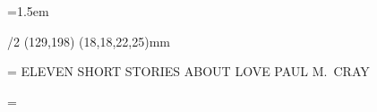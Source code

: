 \def\blankpage{\null\vfill\eject}

\def\startcentered{%
   \begingroup
   \leftskip=0pt plus 1fill
   \rightskip=0pt plus 1fill
   \parindent=0pt
   \obeylines
}
\def\stopcentered{%
   \par
   \endgroup
   \vfill\eject
}

\typosize[10/13] %
\parskip=0pt
\parindent=1.5em %
\emergencystretch=20pt
\hfuzz=1pt %

\enlang {}

\margins/2 (129,198) (18,18,22,25)mm

\def\booktitle{ELEVEN SHORT STORIES ABOUT LOVE} %
\def\authorname{PAUL M.~CRAY}

\nopagenumbers %

\headline={%
   \ifodd\pageno 
      \hfil {\caps \booktitle} \hfil %
   \else
      \hfil {\caps \authorname} \hfil %
   \fi
}

\footline={\hfil \the\pageno \hfil} %


\def\suppressindent{%
   \par\nobreak
   \everypar={\setbox0=\lastbox \everypar={}}%
}

\def\printchap#1{%
   \vfil\break
   \begingroup
      \hyphenpenalty=10000 
      \null\vskip 30mm 
      \centerline{\Albertus\typosize[18/22] #1} 
      \vskip 15mm
      \nobreak
   \endgroup
   \noindent
}

\def\printchap#1#2{%
   \vfil\break
   \begingroup
      \hyphenpenalty=10000 
      \null\vskip 30mm 
      \centerline{\Albertus #1} 
      \vskip 5mm
      \centerline{\twelvett #2} 
      \vskip 15mm
      \nobreak
   \endgroup
   \suppressindent
}

